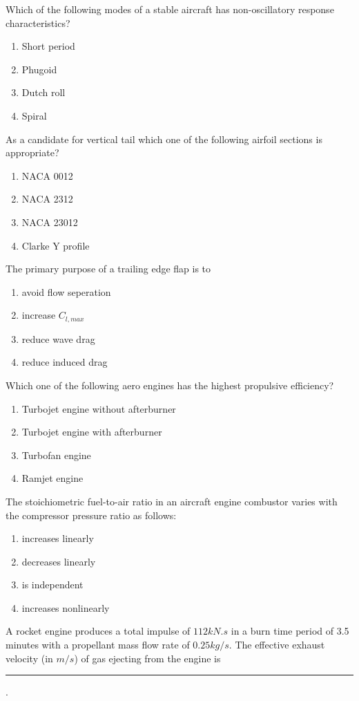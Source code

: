  \item Which of the following modes of a stable aircraft has non-oscillatory response characteristics?
   \begin{enumerate}
  \item Short period
  \item Phugoid
  \item Dutch roll
  \item Spiral
  \end{enumerate}
 \item As a candidate for vertical tail which one of the following airfoil sections is appropriate?
   \begin{enumerate}
  \item NACA 0012
  \item NACA 2312
  \item NACA 23012
  \item Clarke Y profile
  \end{enumerate}
 \item The primary purpose of a trailing edge flap is to
   \begin{enumerate}
  \item avoid flow seperation
  \item increase $C_{l,max}$
  \item reduce wave drag
  \item reduce induced drag
  \end{enumerate}
 \item Which one of the following aero engines has the highest propulsive efficiency?
   \begin{enumerate}
  \item Turbojet engine without afterburner
  \item Turbojet engine with afterburner 
  \item Turbofan engine
  \item Ramjet engine
  \end{enumerate}
 \item The stoichiometric fuel-to-air ratio in an aircraft engine combustor varies with the compressor pressure ratio as follows:
   \begin{enumerate}
  \item increases linearly
  \item decreases linearly 
  \item is independent
  \item increases nonlinearly
  \end{enumerate}
 \item A rocket engine produces a total impulse of $112 kN.s$ in a burn time period of 3.5 minutes with a propellant mass flow rate of $0.25 kg/s$. The effective exhaust velocity (in $m/s$) of gas ejecting from the engine is \rule{2.5cm}{0.4pt}.
